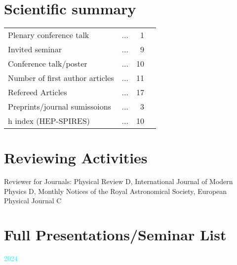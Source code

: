 \documentclass[11pt,a4paper,sans]{moderncv}
\begin{document}
\section{Scientific summary}
\begin{tabular}{ l l r l}
  Plenary conference talk 			& ... & 1  \\  
  Invited seminar         			& ... & 9  \\
  Conference talk/poster 	& ... & 10  \\
  Number of first author articles 	& ... & 11 \\
  Refereed Articles 				& ... & 17 \\
  Preprints/journal sumissoions 		& ... & 3  \\
  h index (HEP-SPIRES) 				& ... & 10 \\
\end{tabular}

\section{Reviewing Activities}
Reviewer for Journals: Physical Review D, International Journal of Modern Physics D, Monthly Notices of the Royal Astronomical Society, European Physical Journal C




\section{Full Presentations/Seminar List}

{\Large \textcolor{cyan}{2024}}
\end{document}
